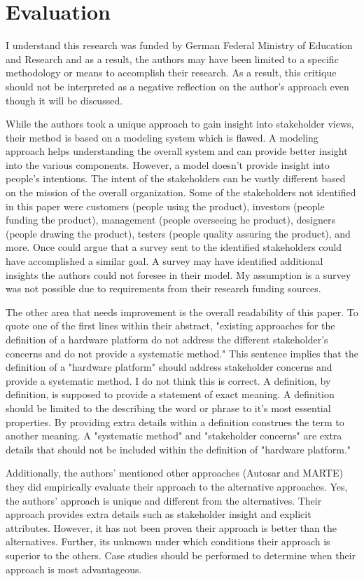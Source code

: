 \documentclass[conference]{IEEEtran}
\begin{document}
\section{Evaluation}
I understand this research was funded by German Federal Ministry of Education and Research and as a result, the authors may have been limited to a specific methodology or means to accomplish their research. As a result, this critique should not be interpreted as a negative reflection on the author's approach even though it will be discussed. 

While the authors took a unique approach to gain insight into stakeholder views, their method is based on a modeling system which is flawed. A modeling approach helps understanding the overall system and can provide better insight into the various components. However, a model doesn't provide insight into people's intentions. The intent of the stakeholders can be vastly different based on the mission of the overall organization. Some of the stakeholders not identified in this paper were customers (people using the product), investors (people funding the product), management (people overseeing he product), designers (people drawing the product), testers (people quality assuring the product), and more. Once could argue that a survey sent to the identified stakeholders could have accomplished a similar goal. A survey may have identified additional insights the authors could not foresee in their model. My assumption is a survey was not possible due to requirements from their research funding sources. 

The other area that needs improvement is the overall readability of this paper. To quote one of the first lines within their abstract, "existing approaches for the definition of a hardware platform do not address the different stakeholder’s concerns and do not provide a systematic method." This sentence implies that the definition of a "hardware platform" should address stakeholder concerns and provide a systematic method. I do not think this is correct. A definition, by definition, is supposed to provide a statement of exact meaning. A definition should be limited to the describing the word or phrase to it's most essential properties. By providing extra details within a definition construes the term to another meaning. A "systematic method" and "stakeholder concerns" are extra details that should not be included within the definition of "hardware platform."

Additionally, the authors' mentioned other approaches (Autosar and MARTE) they did empirically evaluate their approach to the alternative approaches. Yes, the authors' approach is unique and different from the alternatives. Their approach provides extra details such as stakeholder insight and explicit attributes. However, it has not been proven their approach is better than the alternatives. Further, its unknown under which conditions their approach is superior to the others. Case studies should be performed to determine when their approach is most advantageous. 
\end{document}
